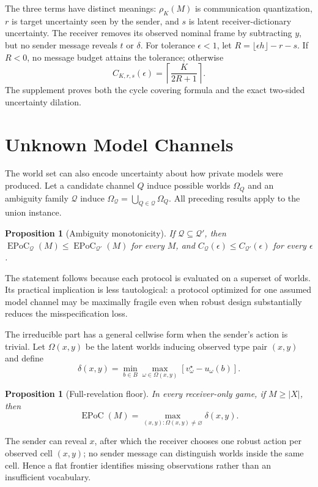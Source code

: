 \documentclass[letterpaper]{article} %
\newtheorem{proposition}[theorem]{Proposition}
\newcommand{\EPoC}{\operatorname{EPoC}}
\begin{document}
The three terms have distinct meanings: $\rho_K(M)$ is communication
quantization, $r$ is target uncertainty seen by the sender, and $s$ is latent
receiver-dictionary uncertainty. The receiver removes its observed nominal
frame by subtracting $y$, but no sender message reveals $t$ or $\delta$.
For tolerance $\epsilon<1$, let
$R=\lfloor\epsilon h\rfloor-r-s$. If $R<0$, no message budget attains the
tolerance; otherwise
\[
C_{K,r,s}(\epsilon)=\left\lceil\frac{K}{2R+1}\right\rceil.
\]
The supplement proves both the cycle covering formula and the exact two-sided
uncertainty dilation.

\section{Unknown Model Channels}

The world set can also encode uncertainty about how private models were
produced. Let a candidate channel $Q$ induce possible worlds $\Omega_Q$ and an
ambiguity family $\mathcal Q$ induce
$\Omega_{\mathcal Q}=\bigcup_{Q\in\mathcal Q}\Omega_Q$. All preceding
results apply to the union instance.

\begin{proposition}[Ambiguity monotonicity]\label{prop:ambiguity}
If $\mathcal Q\subseteq\mathcal Q'$, then
$\EPoC_{\mathcal Q}(M)\le\EPoC_{\mathcal Q'}(M)$ for every $M$, and
$C_{\mathcal Q}(\epsilon)\le C_{\mathcal Q'}(\epsilon)$ for every
$\epsilon$.
\end{proposition}

The statement follows because each protocol is evaluated on a superset of
worlds. Its practical implication is less tautological: a protocol optimized
for one assumed model channel may be maximally fragile even when robust design
substantially reduces the misspecification loss.

The irreducible part has a general cellwise form when the sender's action is
trivial. Let $\Omega(x,y)$ be the latent worlds inducing observed type pair
$(x,y)$ and define
\[
\delta(x,y)=\min_{b\in B}\max_{\omega\in\Omega(x,y)}
 [v_\omega^\star-u_\omega(b)].
\]
\begin{proposition}[Full-revelation floor]\label{prop:full-floor}
In every receiver-only game, if $M\ge |X|$, then
\[
\EPoC(M)=\max_{(x,y):\Omega(x,y)\ne\varnothing}\delta(x,y).
\]
\end{proposition}
The sender can reveal $x$, after which the receiver chooses one robust action
per observed cell $(x,y)$; no sender message can distinguish worlds inside the
same cell. Hence a flat frontier identifies missing observations rather than an
insufficient vocabulary.
\end{document}
